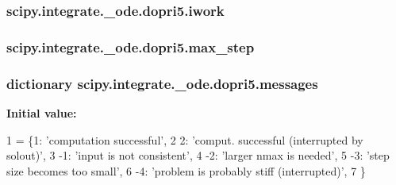 \subsubsection[{iwork}]{\setlength{\rightskip}{0pt plus 5cm}scipy.\+integrate.\+\_\+ode.\+dopri5.\+iwork}\label{classscipy_1_1integrate_1_1__ode_1_1dopri5_a0337a0c4e947f320d2f9b37c109fdd35}
\hypertarget{classscipy_1_1integrate_1_1__ode_1_1dopri5_a0caab2463a55abd94928f44a435d52dc}{}
\subsubsection[{max\+\_\+step}]{\setlength{\rightskip}{0pt plus 5cm}scipy.\+integrate.\+\_\+ode.\+dopri5.\+max\+\_\+step}\label{classscipy_1_1integrate_1_1__ode_1_1dopri5_a0caab2463a55abd94928f44a435d52dc}
\hypertarget{classscipy_1_1integrate_1_1__ode_1_1dopri5_a31708d1834cce9fdcf65cf70c889c35a}{}
\subsubsection[{messages}]{\setlength{\rightskip}{0pt plus 5cm}dictionary scipy.\+integrate.\+\_\+ode.\+dopri5.\+messages\hspace{0.3cm}{\ttfamily [static]}}\label{classscipy_1_1integrate_1_1__ode_1_1dopri5_a31708d1834cce9fdcf65cf70c889c35a}
{\bfseries Initial value\+:}
\begin{DoxyCode}
1 = \{1: \textcolor{stringliteral}{'computation successful'},
2                 2: \textcolor{stringliteral}{'comput. successful (interrupted by solout)'},
3                 -1: \textcolor{stringliteral}{'input is not consistent'},
4                 -2: \textcolor{stringliteral}{'larger nmax is needed'},
5                 -3: \textcolor{stringliteral}{'step size becomes too small'},
6                 -4: \textcolor{stringliteral}{'problem is probably stiff (interrupted)'},
7                 \}
\end{DoxyCode}
\hypertarget{classscipy_1_1integrate_1_1__ode_1_1dopri5_a8cd4b758da84493a2b8cb986cb9d9435}{}
